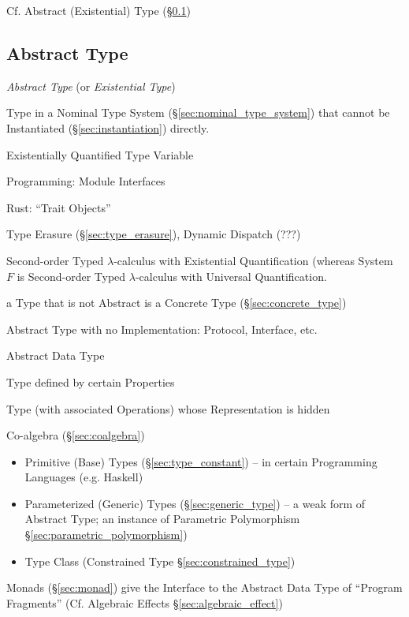 \fist Cf. Abstract (Existential) Type (\S\ref{sec:abstract_type})



\subsection{Abstract Type}\label{sec:abstract_type}

\emph{Abstract Type} (or \emph{Existential Type})

Type in a Nominal Type System (\S\ref{sec:nominal_type_system}) that
cannot be Instantiated (\S\ref{sec:instantiation}) directly.

Existentially Quantified Type Variable

Programming: Module Interfaces

Rust: ``Trait Objects''

Type Erasure (\S\ref{sec:type_erasure}), Dynamic Dispatch (???)

Second-order Typed $\lambda$-calculus with Existential Quantification
(whereas System $F$ is Second-order Typed $\lambda$-calculus with
Universal Quantification.

a Type that is not Abstract is a Concrete Type
(\S\ref{sec:concrete_type})

Abstract Type with no Implementation: Protocol, Interface, etc.


\asterism


Abstract Data Type

Type defined by certain Properties %

Type (with associated Operations) whose Representation is hidden

Co-algebra (\S\ref{sec:coalgebra})

\begin{itemize}
  \item Primitive (Base) Types (\S\ref{sec:type_constant}) -- in
    certain Programming Languages (e.g. Haskell)
  \item Parameterized (Generic) Types (\S\ref{sec:generic_type}) -- a
    weak form of Abstract Type; an instance of Parametric Polymorphism
    \S\ref{sec:parametric_polymorphism})
  \item Type Class (Constrained Type \S\ref{sec:constrained_type})
\end{itemize}

Monads (\S\ref{sec:monad}) give the Interface to the Abstract Data
Type of ``Program Fragments'' (\fist Cf. Algebraic Effects
\S\ref{sec:algebraic_effect})



